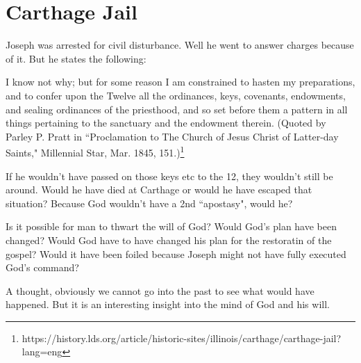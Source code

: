 \section{Carthage Jail}

Joseph was arrested for civil disturbance. Well he went to answer charges
because of it. But he states the following:

\begin{displayquote}
I know not why; but for some reason I am constrained to hasten my  preparations, 
and to confer upon the Twelve all the ordinances, keys,  covenants, endowments, 
and sealing ordinances of the priesthood, and so  set before them a pattern in 
all things pertaining to the sanctuary and  the endowment therein. (Quoted by 
Parley P. Pratt in ``Proclamation to  The Church of Jesus Christ of Latter-day 
Saints," Millennial Star, Mar. 1845, 151.)\footnote{
https://history.lds.org/article/historic-sites/illinois/carthage/carthage-jail?lang=eng
}
\end{displayquote}

If he wouldn't have passed on those keys etc to the 12, they wouldn't still be 
around. Would he have died at Carthage or would he have escaped that situation? 
Because God wouldn't have a 2nd ``apostasy", would he?

Is it possible for man to thwart the will of God? Would God's plan have been changed?
Would God have to have changed his plan for the restoratin of the gospel? Would it
have been foiled because Joseph might not have fully executed God's command?

A thought, obviously we cannot go into the past to see what would have happened. But
it is an interesting insight into the mind of God and his will.